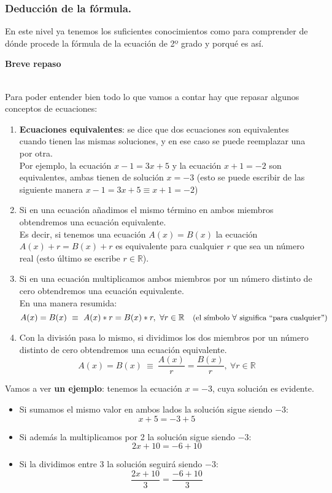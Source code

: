 \documentclass[a4paper,11pt,answers]{exam}
\makeatletter
\newcommand{\realset}{\mathbb{R}}
\newcommand{\labeltext}[2]{%
  \@bsphack
  \MakeLinkTarget*{#1}%
  \def\@currentlabel{#1}{\label{#2}}%
  \@esphack%
}\makeatother
\makeatother
\begin{document}
\subsubsection{Deducción de la fórmula.}
En este nivel ya tenemos los suficientes conocimientos como para comprender de dónde procede la
fórmula de la ecuación de 2º grado y porqué es así.\\

\begin{large}
  \textbf{Breve repaso}\labeltext{breve repaso}{ecs_equivalentes}
\end{large}\\
Para poder entender bien todo lo que vamos a contar hay que repasar algunos conceptos de ecuaciones:
\begin{enumerate}
\item \textbf{Ecuaciones equivalentes}: se dice que dos ecuaciones son equivalentes cuando tienen las mismas soluciones, y en ese caso se puede reemplazar una por otra.\\
  Por ejemplo, la ecuación $x-1 = 3x+5$ y la ecuación $x+1 = -2$ son equivalentes, ambas tienen de solución $x= -3$ (esto se puede escribir de las siguiente manera $x-1 = 3x+5 \equiv x+1 = -2$)
\item Si en una ecuación añadimos el mismo término en ambos miembros obtendremos una ecuación equivalente.\\
  Es decir, si tenemos una ecuación $A(x) = B(x)$ la ecuación $A(x) + r= B(x) + r$ es equivalente para cualquier $r$ que sea un número real (esto último se escribe $r \in \realset$).
\item Si en una ecuación multiplicamos ambos miembros por un número distinto de cero obtendremos
  una ecuación equivalente.\\
  En una manera resumida:
  \[A(x) = B(x)\ \equiv\ A(x)*r = B(x)*r,\ \forall r \in \realset\quad
    \text{\small (el símbolo } \forall\ \text{\small significa ``para cualquier'')}\]
\item Con la división pasa lo mismo, si dividimos los dos miembros por un número distinto de cero
  obtendremos una ecuación equivalente.
  \[A(x) = B(x)\ \equiv\ \frac{A(x)}{r} = \frac{B(x)}{r},\ \forall r \in \realset\]
\end{enumerate}
Vamos a ver \textbf{un ejemplo}: tenemos la ecuación $x=-3$, cuya solución es evidente.\\
\begin{itemize}
\item Si sumamos el mismo valor en ambos lados la solución sigue siendo $-3$:
  \[x+5 = -3 + 5\]
\item Si además la multiplicamos por 2 la solución sigue siendo $-3$:
  \[2x+ 10 = -6 + 10\]
\item Si la dividimos entre 3 la solución seguirá siendo $-3$:
  \[\frac{2x + 10}{3} = \frac{-6 + 10}{3}\]
\end{itemize}\vspace*{.8cm}
\end{document}
